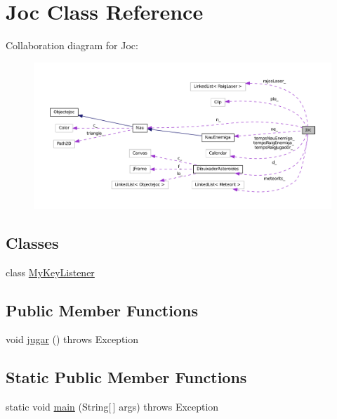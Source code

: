 \hypertarget{class_joc}{}\section{Joc Class Reference}
\label{class_joc}


Collaboration diagram for Joc\+:\nopagebreak
\begin{figure}[H]
\begin{center}
\leavevmode
\includegraphics[width=350pt]{class_joc__coll__graph}
\end{center}
\end{figure}
\subsection*{Classes}
\begin{DoxyCompactItemize}
\item 
class \hyperlink{class_joc_1_1_my_key_listener}{My\+Key\+Listener}
\end{DoxyCompactItemize}
\subsection*{Public Member Functions}
\begin{DoxyCompactItemize}
\item 
void \hyperlink{class_joc_aa5da4464cac2dc81f26430ac16fa7029}{jugar} ()  throws Exception 
\end{DoxyCompactItemize}
\subsection*{Static Public Member Functions}
\begin{DoxyCompactItemize}
\item 
static void \hyperlink{class_joc_a54cbe41c97ce7489f7b0cc62217a7d29}{main} (String\mbox{[}$\,$\mbox{]} args)  throws Exception 
\end{DoxyCompactItemize}
